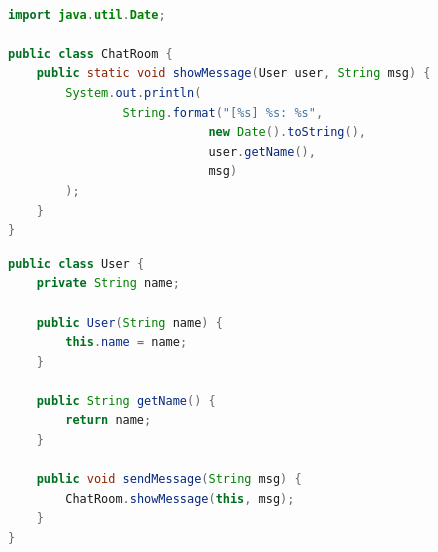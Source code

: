 \\

\begin{figure}[H]
    \centering
\end{figure}

\vspace{0.5cm}

\begin{lstlisting}[language=Java, title=ChatRoom.java]
import java.util.Date;

public class ChatRoom {
    public static void showMessage(User user, String msg) {
        System.out.println(
                String.format("[%s] %s: %s",
                            new Date().toString(),
                            user.getName(),
                            msg)
        );
    }
}
\end{lstlisting}

\begin{lstlisting}[language=Java, title=User.java]
public class User {
    private String name;

    public User(String name) {
        this.name = name;
    }

    public String getName() {
        return name;
    }

    public void sendMessage(String msg) {
        ChatRoom.showMessage(this, msg);
    }
}
\end{lstlisting}

